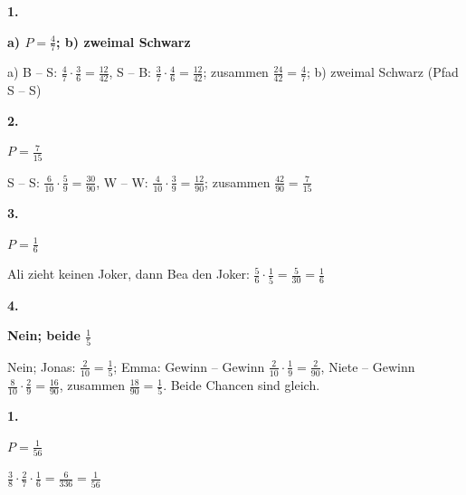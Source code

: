\documentclass[11pt]{article}
\newcommand{\lsg}[3]{\par\noindent\begin{minipage}[t]{9mm}\textbf{#1}\end{minipage}%
  \begin{minipage}[t]{52mm}\raggedright\bfseries\boldmath #2\end{minipage}\hspace{3mm}%
  \begin{minipage}[t]{\dimexpr\linewidth-64mm\relax}\raggedright\small #3\end{minipage}\par\vspace{4pt}}
\begin{document}
\lsg{1.}{a) $P = \frac{4}{7}$; b) zweimal Schwarz}{a) B – S: $\frac{4}{7} \cdot \frac{3}{6} = \frac{12}{42}$, S – B: $\frac{3}{7} \cdot \frac{4}{6} = \frac{12}{42}$; zusammen $\frac{24}{42} = \frac{4}{7}$; b) zweimal Schwarz (Pfad S – S)}
\lsg{2.}{$P = \frac{7}{15}$}{S – S: $\frac{6}{10} \cdot \frac{5}{9} = \frac{30}{90}$, W – W: $\frac{4}{10} \cdot \frac{3}{9} = \frac{12}{90}$; zusammen $\frac{42}{90} = \frac{7}{15}$}
\lsg{3.}{$P = \frac{1}{6}$}{Ali zieht keinen Joker, dann Bea den Joker: $\frac{5}{6} \cdot \frac{1}{5} = \frac{5}{30} = \frac{1}{6}$}
\lsg{4.}{Nein; beide $\frac{1}{5}$}{Nein; Jonas: $\frac{2}{10} = \frac{1}{5}$; Emma: Gewinn – Gewinn $\frac{2}{10} \cdot \frac{1}{9} = \frac{2}{90}$, Niete – Gewinn $\frac{8}{10} \cdot \frac{2}{9} = \frac{16}{90}$, zusammen $\frac{18}{90} = \frac{1}{5}$. Beide Chancen sind gleich.}
\par\Needspace{25mm}\vspace{6pt}\noindent\colorbox{black!12}{}\hspace{2mm}{\bfseries Drei Züge}\par\vspace{4pt}
\lsg{1.}{$P = \frac{1}{56}$}{$\frac{3}{8} \cdot \frac{2}{7} \cdot \frac{1}{6} = \frac{6}{336} = \frac{1}{56}$}
\end{document}
